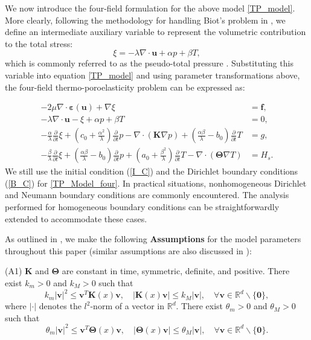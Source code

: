 \documentclass{article}
\numberwithin{equation}{section}
\begin{document}
We now introduce the four-field formulation for the above model \eqref{TP_model}. More clearly, following the methodology for handling Biot's problem
in \cite{lee2017parameter, oyarzua2016locking}, we define an intermediate auxiliary variable to represent the volumetric contribution to the total stress:  
$$  
\xi = -\lambda \nabla \cdot \bm{u} + \alpha p + \beta T,
$$  
which is commonly referred to as the pseudo-total pressure \cite{antonietti2023discontinuous}. Substituting this variable into equation \eqref{TP_model} and using parameter transformations above, the four-field thermo-poroelasticity problem can be expressed as:

\begin{equation}\label{TP_Model_four}
\begin{aligned} 
       -2\mu \nabla\cdot \bm\varepsilon(\bm u) +\nabla\xi 
                      &=\bm f, \\
      -\lambda \nabla\cdot\bm u-\xi+\alpha p+\beta T
                      &=0, \\
-\frac\alpha\lambda\frac\partial{\partial t}\xi+(c_0+\frac{\alpha^2}\lambda)\frac\partial{\partial t}p
                 -\nabla\cdot(\bm K\nabla p)+(\frac{\alpha\beta}\lambda-b_0)\frac\partial{\partial t}T
                      &=g, \\
-\frac\beta\lambda\frac\partial{\partial t}\xi +(\frac{\alpha\beta}\lambda-b_0)\frac\partial{\partial t}p
+(a_0+\frac{\beta^2}\lambda)\frac\partial{\partial t}T
                  -\nabla\cdot(\bm \Theta\nabla T)
                      &= H_{s}. 
\end{aligned}
\end{equation}
We still use the initial condition (\ref{I_C}) and the Dirichlet boundary conditions (\ref{B_C}) for \eqref{TP_Model_four}. In practical situations, nonhomogeneous Dirichlet and Neumann boundary conditions are commonly encountered. The analysis performed for homogeneous boundary conditions can be straightforwardly extended to accommodate these cases.

As outlined in \cite{brun2020monolithic}, we make the following \textbf{Assumptions} for the model parameters throughout this paper (similar assumptions are also discussed in \cite{chen2022multiphysics, zhang2024coupling}):
 
(A1) $\bm K$ and $\bm\Theta$ are constant in time, symmetric, definite, and positive. There exist $k_m>0$
and $k_M>0$ such that
$$ k_m|\bm v|^2 \le \bm v^T\bm K(x)\bm v,\quad |\bm K(x)\bm v|\le k_M|\bm v|,\quad \forall \bm v\in\mathbb R^d \backslash \{\bm 0\}, $$
where $|\cdot|$ denotes the $l^2$-norm of a vector in $\mathbb R^d$.
There exist  $\theta_m>0$ and $\theta_M>0$ such that
$$ \theta_m|\bm v|^2 \le \bm v^T\bm\Theta(x)\bm v,\quad |\bm\Theta(x)\bm v|\le\theta_M|\bm v|,\quad \forall \bm v\in\mathbb R^d 
\backslash \{\bm 0\}. $$
\end{document}
